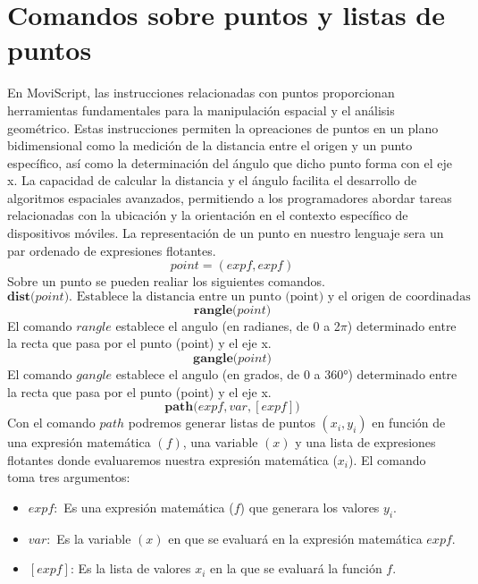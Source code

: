 \documentclass[11pt]{scrartcl}
\begin{document}
\section{Comandos sobre puntos y listas de puntos}
En MoviScript, las instrucciones relacionadas con puntos proporcionan herramientas 
fundamentales para la manipulación espacial y el análisis geom\'etrico. 
Estas instrucciones permiten la opreaciones de puntos en un plano bidimensional 
 como la medición de la distancia entre el origen y un punto específico, 
 as\'i como la determinación del \'angulo que dicho punto forma con el eje x. 
 La capacidad de calcular la distancia y el \'angulo facilita el desarrollo de 
 algoritmos espaciales avanzados, permitiendo a los programadores abordar tareas 
 relacionadas con la ubicaci\'on y la orientación en el contexto específico de 
 dispositivos m\'oviles. \newline
La representaci\'on de un punto en nuestro lenguaje sera un par ordenado de expresiones flotantes.
 \begin{equation*}
point = ( expf , expf )
\end{equation*}
Sobre un punto se pueden realiar los siguientes comandos.
\begin{equation*}
\textbf{dist(}point\textbf{)}
\text{. Establece la distancia entre un punto 
(point) y el origen de coordinadas}
\end{equation*}
\begin{equation*}
    \textbf{rangle(}point\textbf{)}
    \end{equation*}
El comando $rangle$ establece el angulo (en radianes, de 0 a 2\(\pi\)) determinado entre la recta que pasa por el punto 
(point) y el eje x.
\begin{equation*}
    \textbf{gangle(}point\textbf{)}
    \end{equation*}
El comando $gangle$ establece el angulo (en grados, de 0 a 360°) determinado entre la recta que pasa por el punto 
(point) y el eje x.
\begin{equation*}
\textbf{path(}expf , var, [expf] \textbf{)}
\end{equation*}
Con el comando $path$ podremos generar listas de puntos $(x_i,y_i)$ en funci\'on de una 
expresi\'on matem\'atica $(f)$, una variable $(x)$ y una lista de expresiones flotantes
 donde evaluaremos nuestra expresi\'on matem\'atica ($x_i$).
El comando toma tres argumentos:
\begin{itemize}
    \item $expf:$ Es una expresi\'on matem\'atica ($f$) que generara los valores $y_i$. 
    \item $var:$ Es la variable $(x)$ en que se evaluar\'a en la expresi\'on matem\'atica $expf$.  
    \item $[expf]$: Es la lista de valores $x_i$ en la que se evaluar\'a la funci\'on $f$.
\end{itemize}
\end{document}
